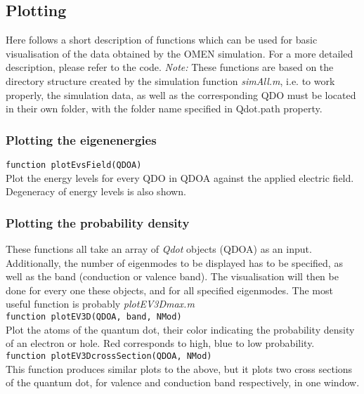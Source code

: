 \subsection{Plotting}
Here follows a short description of functions which can be used for basic visualisation of the data obtained by the OMEN simulation. For a more detailed description, please refer to the code.
\textit{Note:} These functions are based on the directory structure created by the simulation function \textit{simAll.m}, i.e. to work properly, the simulation data, as well as the corresponding QDO must be located in their own folder, with the folder name specified in Qdot.path property.

\subsubsection{Plotting the eigenenergies}
\lstinline{function plotEvsField(QDOA)}\\

Plot the energy levels for every QDO in QDOA against the applied electric field. Degeneracy of energy levels is also shown.

\subsubsection{Plotting the probability density}
These functions all take an array of \textit{Qdot} objects (QDOA) as an input. Additionally, the number of eigenmodes to be displayed has to be specified, as well as the band (conduction or valence band). The visualisation will then be done for every one these objects, and for all specified eigenmodes. The most useful function is probably \textit{plotEV3Dmax.m}\\

\lstinline{function plotEV3D(QDOA, band, NMod) }\\

Plot the atoms of the quantum dot, their color indicating the probability density of an electron or hole. Red corresponds to high, blue to low probability.\\

\lstinline{function plotEV3DcrossSection(QDOA, NMod) }\\

This function produces similar plots to the above, but it plots two cross sections of the quantum dot, for valence and conduction band respectively, 
in one window.\\

